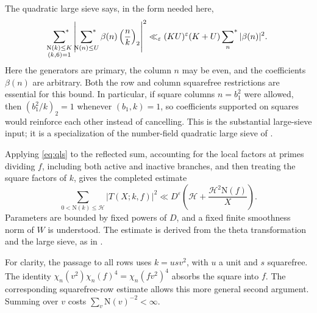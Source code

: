 \documentclass[11pt]{article}
\newcommand{\N}{\mathrm N}
\newcommand{\starred}{\sideset{}{^*}\sum}
\numberwithin{equation}{section}
\begin{document}
The quadratic large sieve says, in the form needed here,
\begin{equation}\label{eq:qls}
 \starred_{\substack{\N(k)\le K\\(k,6)=1}}
 \left|\starred_{\N(n)\le U}\beta(n)\left(\frac nk\right)_2\right|^2
 \ll_\varepsilon(KU)^\varepsilon(K+U)\starred_n|\beta(n)|^2.
\end{equation}
Here the generators are primary, the column $n$ may be even, and the
coefficients $\beta(n)$ are arbitrary. Both the row and column squarefree
restrictions are essential for this bound. In particular, if square
columns $n=b_1^2$ were allowed, then $(b_1^2/k)_2=1$ whenever
$(b_1,k)=1$, so coefficients supported on squares would reinforce each
other instead of cancelling. This is the substantial large-sieve input; it is a specialization of the
number-field quadratic large sieve of \cite{GL}.

Applying \eqref{eq:qls} to the reflected sum, accounting for the local
factors at primes dividing $f$, including both active and inactive branches,
and then treating the square factors of
$k$, gives the completed estimate
\begin{equation}\label{eq:completed}
 \boxed{\quad\sum_{0<\N(k)\le\mathcal H}|T(X;k,f)|^2
 \ll D^\varepsilon\left(\mathcal H+
                   \frac{\mathcal H^2\N(f)}X\right).\quad}
\end{equation}
Parameters are bounded by fixed powers of $D$, and a fixed finite
smoothness norm of $W$ is understood. The estimate is derived from the theta transformation and the large sieve,
as in \cite[Proposition~5.2 and Section~6]{original}.

For clarity, the passage to all rows uses $k=usv^2$, with $u$ a unit and
$s$ squarefree. The identity
$\chi_n(v^2)\chi_n(f)^4=\chi_n(fv^2)^4$ absorbs the square into $f$.
The corresponding squarefree-row estimate allows this more general
second argument. Summing over $v$ costs $\sum_v\N(v)^{-2}<\infty$.
\end{document}
